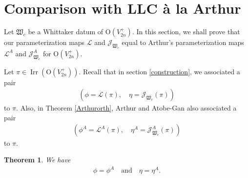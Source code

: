 \documentclass[article]{article}
\numberwithin{equation}{section}
\newtheorem{theorem}{Theorem}[section]
\theoremstyle{definition}
\DeclareMathOperator{\Irr}{Irr}
\begin{document}
\section{Comparison with LLC à la Arthur}
Let $\mathfrak W_c$ be a Whittaker datum of $\mathrm O(V_{2n}^+)$. In this section, we shall prove that our parameterization maps $\mathcal L$ and $\mathcal J_{\mathfrak W_c}$ equal to Arthur's parameterization maps $\mathcal L^A$ and $\mathcal J^A_{\mathfrak W_c}$ for $\mathrm O(V_{2n}^+)$.  

Let $\pi\in \Irr(\mathrm O(V_{2n}^+))$. Recall that in section \ref{construction}, we associated a pair
\begin{align*}
\left(\phi= \mathcal L(\pi), \quad \eta=\mathcal J_{\mathfrak W_c}(\pi)\right)
\end{align*}
to $\pi$. Also, in Theorem \ref{Arthurorth}, Arthur and Atobe-Gan also associated a pair 
\begin{align*}
\left(\phi^A= \mathcal L^A(\pi), \quad \eta^A=\mathcal J^A_{\mathfrak W_c}(\pi)\right)
\end{align*}
to $\pi$. 
\begin{theorem}\label{comparearthur}
	We have 
	\begin{align*}
	\phi=\phi^A \quad \mbox{and}\quad \eta=\eta^A. 
	\end{align*}
\end{theorem}
\end{document}
